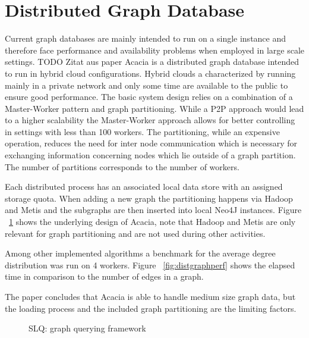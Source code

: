 \documentclass{sig-alternate}
\begin{document}
\section{Distributed Graph Database}
Current graph databases are mainly intended to run on a single instance and therefore
face performance and availability problems when employed in large scale settings. TODO Zitat aus paper 
Acacia is a distributed graph database intended to run in hybrid cloud configurations.
Hybrid clouds a characterized by running mainly in a private network and only
some time are available to the public to ensure good performance.
The basic system design relies on a combination of a Master-Worker pattern 
and graph partitioning. While a P2P approach would lead to a higher scalability
the Master-Worker approach allows for better controlling in settings with less than 100 workers.
The partitioning, while an expensive operation, reduces the need for inter node communication
which is necessary for exchanging information concerning nodes which lie outside of a graph partition.
The number of partitions corresponds to the number of workers.

Each distributed process has an associated local data store with an assigned storage quota.
When adding a new graph the partitioning happens via Hadoop and Metis and the subgraphs are then inserted into local
Neo4J instances. Figure ~\ref{fig:distgraph} shows the underlying design of Acacia, note that Hadoop and Metis 
are only relevant for graph partitioning and are not used during other 
activities.

Among other implemented algorithms a benchmark for the average degree distribution was run on 4 workers.
Figure ~\ref{fig:distgraphperf} shows the elapsed time in comparison to the number of edges in a graph.

The paper concludes that Acacia is able to handle medium size graph data, but the loading process and 
the included graph partitioning are the limiting factors.

\begin{figure}
\centering
{}
\caption{SLQ: graph querying framework}
\label{fig:distgraph}
\end{figure}
\end{document}
